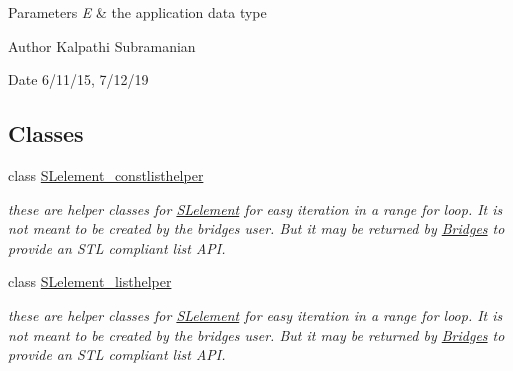\begin{DoxyParams}{Parameters}
{\em E} & the application data type\\
\hline
\end{DoxyParams}
\begin{DoxyAuthor}{Author}
Kalpathi Subramanian 
\end{DoxyAuthor}
\begin{DoxyDate}{Date}
6/11/15, 7/12/19 
\end{DoxyDate}
\subsection*{Classes}
\begin{DoxyCompactItemize}
\item 
class \mbox{\hyperlink{classbridges_1_1datastructure_1_1_s_lelement_1_1_s_lelement__constlisthelper}{S\+Lelement\+\_\+constlisthelper}}
\begin{DoxyCompactList}\small\item\em these are helper classes for \mbox{\hyperlink{classbridges_1_1datastructure_1_1_s_lelement}{S\+Lelement}} for easy iteration in a range for loop. It is not meant to be created by the bridges user. But it may be returned by \mbox{\hyperlink{classbridges_1_1_bridges}{Bridges}} to provide an S\+TL compliant list A\+PI. \end{DoxyCompactList}\item 
class \mbox{\hyperlink{classbridges_1_1datastructure_1_1_s_lelement_1_1_s_lelement__listhelper}{S\+Lelement\+\_\+listhelper}}
\begin{DoxyCompactList}\small\item\em these are helper classes for \mbox{\hyperlink{classbridges_1_1datastructure_1_1_s_lelement}{S\+Lelement}} for easy iteration in a range for loop. It is not meant to be created by the bridges user. But it may be returned by \mbox{\hyperlink{classbridges_1_1_bridges}{Bridges}} to provide an S\+TL compliant list A\+PI. \end{DoxyCompactList}\end{DoxyCompactItemize}
